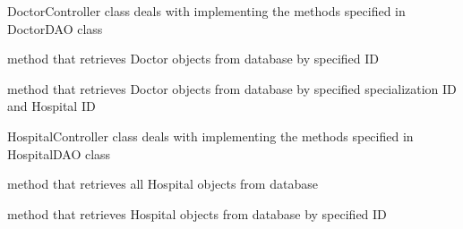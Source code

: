 \documentclass[letterpaper,10pt,english]{sphinxmanual}
\begin{document}

\begin{fulllineitems}
\label{controllers:doctors.controllers.DoctorController}
DoctorController class deals with implementing the methods specified in DoctorDAO class

\begin{fulllineitems}
\label{controllers:doctors.controllers.DoctorController.getById}
method that retrieves  Doctor objects from database by specified ID

\end{fulllineitems}


\begin{fulllineitems}
\label{controllers:doctors.controllers.DoctorController.getBySpecHospId}
method that retrieves  Doctor objects from database by specified specialization ID and Hospital ID

\end{fulllineitems}


\end{fulllineitems}


\begin{fulllineitems}
\label{controllers:doctors.controllers.HospitalController}
HospitalController class deals with implementing the methods specified in HospitalDAO class

\begin{fulllineitems}
\label{controllers:doctors.controllers.HospitalController.getAll}
method that retrieves all Hospital objects from database

\end{fulllineitems}


\begin{fulllineitems}
\label{controllers:doctors.controllers.HospitalController.getById}
method that retrieves Hospital objects from database by specified ID

\end{fulllineitems}


\end{fulllineitems}
\end{document}
